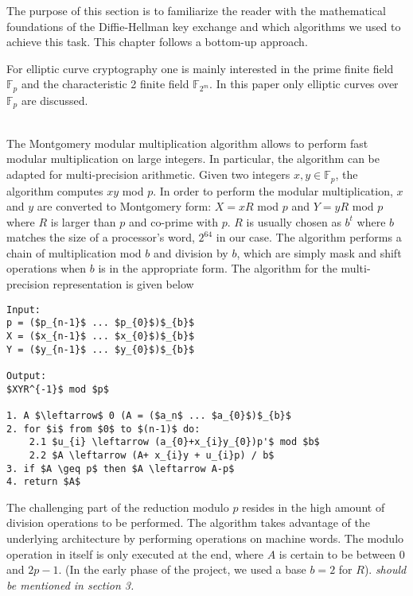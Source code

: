 The purpose of this section is to familiarize the reader with the mathematical foundations of the Diffie-Hellman key exchange and which algorithms we used to achieve this task. This chapter follows a bottom-up approach.

 For elliptic curve cryptography one is mainly interested in the prime finite field $\mathbb{F}_p$ and the characteristic 2 finite field $\mathbb{F}_{2^m}$. In this paper only elliptic curves over $\mathbb{F}_p$ are discussed.

\\The Montgomery modular multiplication algorithm allows to perform fast modular multiplication on large integers. In particular, the algorithm can be adapted for multi-precision arithmetic. Given two integers $x,y \in \mathbb{F}_p$, the algorithm computes $xy$ mod $p$. In order to perform the modular multiplication, $x$ and $y$ are converted to Montgomery form: $X = xR$ mod $p$ and $Y = yR$ mod $p$ where $R$ is larger than $p$ and co-prime with $p$. $R$ is usually chosen as $b^{t}$ where $b$ matches the size of a processor's word, $2^{64}$ in our case. The algorithm performs a chain of multiplication mod $b$ and division by $b$, which are simply mask and shift operations when $b$ is in the appropriate form. The algorithm for the multi-precision representation is given below \cite[p. 602]{Menezes:1996}


\begin{lstlisting}[frame=single, mathescape=true, captionpos=b, caption=Mulitprecision Montogmery Modular Multiplication ]
Input: 
p = ($p_{n-1}$ ... $p_{0}$)$_{b}$
X = ($x_{n-1}$ ... $x_{0}$)$_{b}$
Y = ($y_{n-1}$ ... $y_{0}$)$_{b}$

Output:
$XYR^{-1}$ mod $p$

1. A $\leftarrow$ 0 (A = ($a_n$ ... $a_{0}$)$_{b}$
2. for $i$ from $0$ to $(n-1)$ do:
	2.1 $u_{i} \leftarrow (a_{0}+x_{i}y_{0})p'$ mod $b$
	2.2 $A \leftarrow (A+ x_{i}y + u_{i}p) / b$
3. if $A \geq p$ then $A \leftarrow A-p$
4. return $A$
\end{lstlisting}

The challenging part of the reduction modulo $p$ resides in the high amount of division operations to be performed. The algorithm takes advantage of the underlying architecture by performing operations on machine words. The modulo operation in itself is only executed at the end, where $A$ is certain to be between $0$ and $2p-1$. (In the early phase of the project, we used a base $b=2$ for $R$). \emph{should be mentioned in section 3.}

